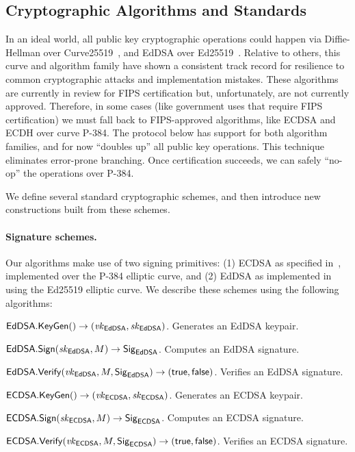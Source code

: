 \subsection{Cryptographic Algorithms and Standards}

In an ideal world, all public key cryptographic operations could happen via Diffie-Hellman over Curve25519~\cite{bernstein2006curve25519}, and EdDSA over Ed25519~\cite{eddsa}. Relative to others, this curve and algorithm family have shown a consistent track record for resilience to common cryptographic attacks and implementation mistakes. These algorithms are currently in review for FIPS certification but, unfortunately, are not currently approved. Therefore, in some cases (like government uses that require FIPS certification) we must fall back to FIPS-approved algorithms, like ECDSA and ECDH over curve P-384. The protocol below has support for both algorithm families, and for now ``doubles up'' all public key operations. This technique eliminates error-prone branching. Once certification succeeds, we can safely ``no-op'' the operations over P-384.

We define several standard cryptographic schemes, and then introduce new constructions built from these schemes.

\paragraph{Signature schemes.} Our algorithms make use of two signing primitives: (1) ECDSA as specified in~\cite{fips186}, implemented over the P-384 elliptic curve, and (2) EdDSA as implemented in~\cite{rfc8032} using the Ed25519 elliptic curve. We describe these schemes using the following algorithms:

\begin{description*}
\item ${\sf EdDSA}.\mathsf{KeyGen}() \rightarrow (\mathit{vk}_{{\sf EdDSA}}, \mathit{sk}_{{\sf EdDSA}})$. Generates an EdDSA keypair.
\item ${\sf EdDSA}.\mathsf{Sign}(\mathit{sk}_{{\sf EdDSA}}, M) \rightarrow {\sf Sig}_{{\sf EdDSA}}$. Computes an EdDSA signature.
\item ${\sf EdDSA}.\mathsf{Verify}(\mathit{vk}_{{\sf EdDSA}}, M, {\sf Sig}_{{\sf EdDSA}}) \rightarrow (\mathsf{true}, \mathsf{false})$. Verifies an EdDSA signature.
\end{description*}

\begin{description*}
\item ${\sf ECDSA}.\mathsf{KeyGen}() \rightarrow (\mathit{vk}_{{\sf ECDSA}}, \mathit{sk}_{{\sf ECDSA}})$. Generates an ECDSA keypair.
\item ${\sf ECDSA}.\mathsf{Sign}(\mathit{sk}_{{\sf ECDSA}}, M) \rightarrow {\sf Sig}_{{\sf ECDSA}}$. Computes an ECDSA signature.
\item ${\sf ECDSA}.\mathsf{Verify}(\mathit{vk}_{{\sf ECDSA}}, M, {\sf Sig}_{{\sf ECDSA}}) \rightarrow (\mathsf{true}, \mathsf{false})$. Verifies an ECDSA signature.
\end{description*}

